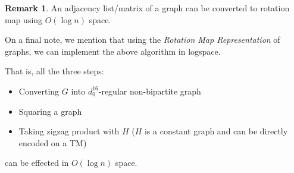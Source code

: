 \documentclass[10pt]{article}
\theoremstyle{plain}
\theoremstyle{definition}
\newtheorem*{remark}{Remark}
\begin{document}
\begin{remark}
An adjacency list/matrix of a graph can be converted to rotation map using $O(\log n)$ space.
\end{remark}

On a final note, we mention that using the \textsl{Rotation Map Representation} of graphs, we can implement the above algorithm in logspace.

That is, all the three steps:
\begin{itemize}
    \item Converting $G$ into $d_0^{16}$-regular non-bipartite graph
    \item Squaring a graph
    \item Taking zigzag product with $H$ ($H$ is a constant graph and can be directly encoded on a TM)
\end{itemize}
can be effected in $O(\log n)$ space.


\printbibliography
\end{document}
